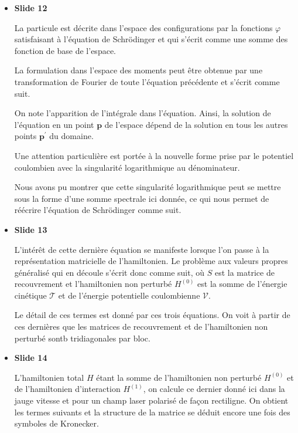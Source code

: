 \documentclass[10pt,a4paper]{article}
\begin{document}
\begin{itemize}
Sur la figure est repr\'esent\'ee l'effet sur les fonctions 
sturmiennes de la variation du param\`etre non lin\'eaire $\kappa$.
On peut voir que $\kappa$ a ici un effet sur l'amplitude 
de la fonction d'onde, tandis que son extension spatiale
reste localis\'ee entre -1 et 1.
Cette r\'eduction du domaine auparavant de 0 \`a l'infini
\`a l'intervalle $\left[-1;+1\right]$ ext exactement ce qui rend l'espace des 
moments attractif sur la plan num\'erique.

\item \textbf{Slide 12}\par
La particule est d\'ecrite dans l'espace des configurations 
par la fonctions $\varphi$ satisfaisant \`a l'\'equation de Schr\"odinger 
et qui s'\'ecrit comme une somme des fonction de base de l'espace.

La formulation dans l'espace des moments peut \^etre obtenue 
par une transformation de Fourier de toute l'\'equation pr\'ec\'edente 
et s'\'ecrit comme suit.

On note l'apparition de l'int\'egrale dans l'\'equation.
Ainsi, la solution de l'\'equation en un point $\boldsymbol{p}$
de l'espace d\'epend de la solution en tous les autres points 
$\boldsymbol{p}^\prime$ du domaine. 

Une attention particuli\`ere  est port\'ee \`a la nouvelle 
forme prise par le potentiel coulombien avec la singularit\'e
logarithmique au d\'enominateur.

Nous avons pu montrer que cette singularit\'e logarithmique 
peut se mettre sous la forme d'une somme spectrale ici donn\'ee, 
ce qui nous permet de r\'e\'ecrire l'\'equation de Schr\"odinger 
comme suit.

\item \textbf{Slide 13}\par
L'int\'er\^et de cette derni\`ere \'equation se manifeste lorsque 
l'on passe \`a la repr\'esentation matricielle de l'hamiltonien.
Le probl\`eme aux valeurs propres g\'en\'eralis\'e qui en d\'ecoule
s'\'ecrit donc comme suit, o\`u $S$ est la matrice de recouvrement
et l'hamiltonien non perturb\'e $H^{(0)}$ est la somme de 
l'\'energie cin\'etique $\mathcal{T}$ 
et de l'\'energie potentielle coulombienne $\mathcal{V}$.

Le d\'etail de ces termes est donn\'e par ces trois \'equations.
On voit \`a partir de ces derni\`eres que les matrices de recouvrement 
et de l'hamiltonien non perturb\'e sontb tridiagonales par bloc.

\item \textbf{Slide 14}\par
L'hamiltonien total $H$ \'etant la somme de l'hamiltonien non perturb\'e 
$H^{(0)}$ et de l'hamiltonien d'interaction $H^{(1)}$, 
on calcule ce dernier donn\'e ici dans la jauge vitesse et 
pour un champ laser polaris\'e de fa\c con rectiligne.
On obtient les termes suivants et la structure de la matrice se d\'eduit
encore une fois des symboles de Kronecker. 


\end{itemize}
\end{document}
